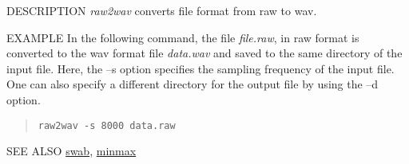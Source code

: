 \begin{synopsis}
\item[raw2wav] [ --swab ][ --s $S$ ] [ --d $D$ ] [ --n ] [ --N ] [ +{\em type} ] [ {\em infile} ]
\end{synopsis}

\begin{qsection}{DESCRIPTION}
{\em raw2wav} converts file format from raw to wav.

\end{qsection}

\begin{options}
\end{options}

\begin{qsection}{EXAMPLE}
In the following command, the file {\em file.raw},
 in raw format is converted to the wav format file {\em data.wav}
 and saved to the same directory of the input file.
 Here, the --s option specifies the sampling frequency of the input file.
 One can also specify a different directory for the output file
 by using the --d option.
\begin{quote}
  \verb!raw2wav -s 8000 data.raw!
\end{quote}
\end{qsection}

\begin{qsection}{SEE ALSO}
\hyperlink{swab}{swab},
\hyperlink{minmax}{minmax}
\end{qsection}
